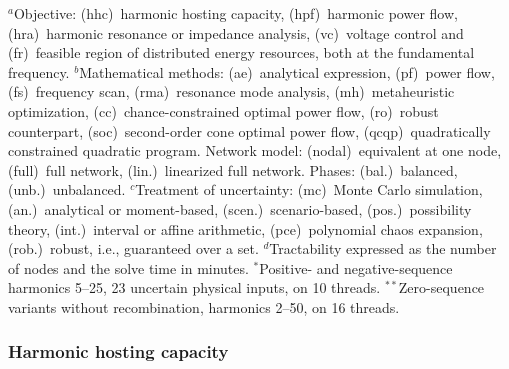 \begin{table}[!t]
    \vspace{2pt}
    \parbox{\textwidth}{\scriptsize
    $^{a}$Objective: (hhc)~harmonic hosting capacity, (hpf)~harmonic power flow, (hra)~harmonic resonance or impedance analysis, (vc)~voltage control and (fr)~feasible region of distributed energy resources, both at the fundamental frequency.
    $^{b}$Mathematical methods: (ae)~analytical expression, (pf)~power flow, (fs)~frequency scan, (rma)~resonance mode analysis, (mh)~metaheuristic optimization, (cc)~chance-constrained optimal power flow, (ro)~robust counterpart, (soc)~second-order cone optimal power flow, (qcqp)~quadratically constrained quadratic program. Network model: (nodal)~equivalent at one node, (full)~full network, (lin.)~linearized full network. Phases: (bal.)~balanced, (unb.)~unbalanced.
    $^{c}$Treatment of uncertainty: (mc)~Monte Carlo simulation, (an.)~analytical or moment-based, (scen.)~scenario-based, (pos.)~possibility theory, (int.)~interval or affine arithmetic, (pce)~polynomial chaos expansion, (rob.)~robust, i.e., guaranteed over a set.
    $^{d}$Tractability expressed as the number of nodes and the solve time in minutes. $^{*}$Positive- and negative-sequence harmonics 5--25, 23 uncertain physical inputs, on 10 threads. $^{**}$Zero-sequence variants without recombination, harmonics 2--50, on 16 threads.}
\end{table}

\subsubsection{Harmonic hosting capacity}

